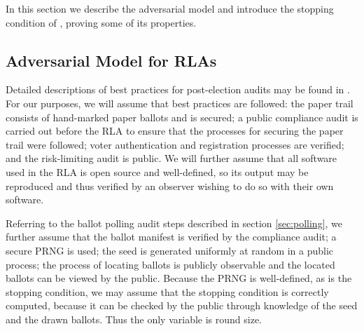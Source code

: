 In this section we describe the adversarial model and introduce the stopping condition of \Providence, proving some of its properties.



\subsection{Adversarial Model for RLAs}
\label{sec:adv}
Detailed descriptions of best practices for post-election audits may be found in \cite{best-practices,why-and-how}. For our purposes, we will assume that best practices are followed: the paper trail consists of hand-marked paper ballots and is secured; a public compliance audit is carried out before the RLA to ensure that the processes for securing the paper trail were followed; voter authentication and registration processes are verified; and 
the risk-limiting audit is public. We will further assume that all software used in the RLA is open source and well-defined, so its output may be reproduced and thus verified by an observer wishing to do so with their own software. 

Referring to the ballot polling audit steps described in section \ref{sec:polling}, we further assume that the ballot manifest is verified by the compliance audit; a secure PRNG is used; the seed is generated uniformly at random in a public process; the process of locating ballots is publicly observable and the located ballots can be viewed by the public. Because the PRNG is well-defined, as is the stopping condition, we may assume that the stopping condition is correctly computed, because it can be checked by the public through knowledge of the seed and the drawn ballots. Thus the only variable is round size. 


